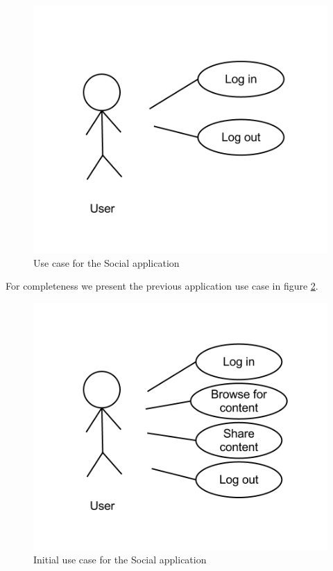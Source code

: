 \begin{figure}[H]
	\centering \includegraphics[scale=0.35]{img/design-socialappusecase2}
	\caption{Use case for the Social application}
	\label{fig:design-socialappusecase2}
\end{figure}

For completeness we present the previous application use case in figure \ref{fig:design-socialappusecase1}.

\begin{figure}[H]
	\centering \includegraphics[scale=0.35]{img/design-socialappusecase1}
	\caption{Initial use case for the Social application}
	\label{fig:design-socialappusecase1}
\end{figure}

